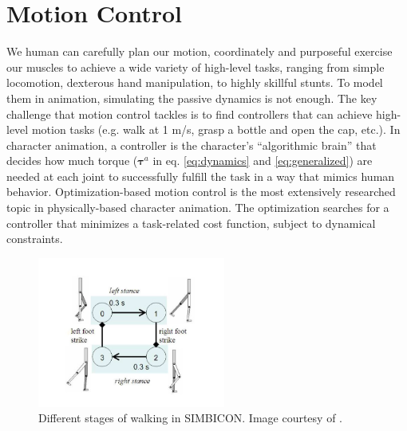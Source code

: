 \section{Motion Control}
We human can carefully plan our motion, coordinately and purposeful exercise our muscles to achieve a wide variety of high-level tasks, ranging from simple locomotion, dexterous hand manipulation, to highly skillful stunts. To model them in animation, simulating the passive dynamics is not enough. The key challenge that motion control tackles is to find controllers that can achieve high-level motion tasks (e.g. walk at 1 m/s, grasp a bottle and open the cap, etc.). In character animation, a controller is the character's ``algorithmic brain'' that decides how much torque ($\boldsymbol{\tau}^a$ in eq. \ref{eq:dynamics} and \ref{eq:generalized}) are needed at each joint to successfully fulfill the task in a way that mimics human behavior. Optimization-based motion control is the most extensively researched topic in physically-based character animation. The optimization searches for a controller that minimizes a task-related cost function, subject to dynamical constraints.

\begin{figure}[h]
  \centering
  \includegraphics[width=0.55\textwidth]{figures/stateMachine.jpg}
  \caption{Different stages of walking in SIMBICON. Image courtesy of \cite{Yin:2007}.}
  \label{fig:stateMachine}
\end{figure}

